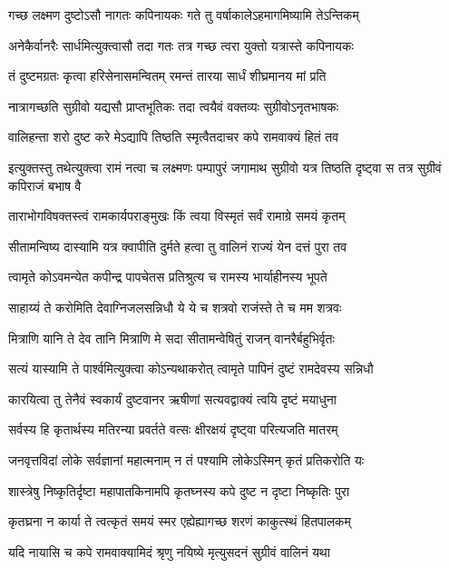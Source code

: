 \twolineshloka
{गच्छ लक्ष्मण दुष्टोऽसौ नागतः कपिनायकः}
{गते तु वर्षाकालेऽहमागमिष्यामि तेऽन्तिकम्} %

\twolineshloka
{अनेकैर्वानरैः सार्धमित्युक्त्वासौ तदा गतः}
{तत्र गच्छ त्वरा युक्तो यत्रास्ते कपिनायकः} %

\twolineshloka
{तं दुष्टमग्रतः कृत्वा हरिसेनासमन्वितम्}
{रमन्तं तारया सार्धं शीघ्रमानय मां प्रति} %

\twolineshloka
{नात्रागच्छति सुग्रीवो यद्यसौ प्राप्तभूतिकः}
{तदा त्वयैवं वक्तव्यः सुग्रीवोऽनृतभाषकः} %

\twolineshloka
{वालिहन्ता शरो दुष्ट करे मेऽद्यापि तिष्ठति}
{स्मृत्वैतदाचर कपे रामवाक्यं हितं तव} %

\threelineshloka
{इत्युक्तस्तु तथेत्युक्त्वा रामं नत्वा च लक्ष्मणः}
{पम्पापुरं जगामाथ सुग्रीवो यत्र तिष्ठति}
{दृष्ट्वा स तत्र सुग्रीवं कपिराजं बभाष वै} %

\twolineshloka
{ताराभोगविषक्तस्त्वं रामकार्यपराङ्मुखः}
{किं त्वया विस्मृतं सर्वं रामाग्रे समयं कृतम्} %

\twolineshloka
{सीतामन्विष्य दास्यामि यत्र क्वापीति दुर्मते}
{हत्वा तु वालिनं राज्यं येन दत्तं पुरा तव} %

\twolineshloka
{त्वामृते कोऽवमन्येत कपीन्द्र पापचेतस}
{प्रतिश्रुत्य च रामस्य भार्याहीनस्य भूपते} %

\twolineshloka
{साहाय्यं ते करोमिति देवाग्निजलसन्निधौ}
{ये ये च शत्रवो राजंस्ते ते च मम शत्रवः} %

\twolineshloka
{मित्राणि यानि ते देव तानि मित्राणि मे सदा}
{सीतामन्वेषितुं राजन् वानरैर्बहुभिर्वृतः} %

\twolineshloka
{सत्यं यास्यामि ते पार्श्वमित्युक्त्वा कोऽन्यथाकरोत्}
{त्वामृते पापिनं दुष्टं रामदेवस्य सन्निधौ} %

\twolineshloka
{कारयित्वा तु तेनैवं स्वकार्यं दुष्टवानर}
{ऋषीणां सत्यवद्वाक्यं त्वयि दृष्टं मयाधुना} %

\twolineshloka
{सर्वस्य हि कृतार्थस्य मतिरन्या प्रवर्तते}
{वत्सः क्षीरक्षयं दृष्ट्वा परित्यजति मातरम्} %

\twolineshloka
{जनवृत्तविदां लोके सर्वज्ञानां महात्मनाम्}
{न तं पश्यामि लोकेऽस्मिन् कृतं प्रतिकरोति यः} %

\twolineshloka
{शास्त्रेषु निष्कृतिर्दृष्टा महापातकिनामपि}
{कृतघ्नस्य कपे दुष्ट न दृष्टा निष्कृतिः पुरा} %

\twolineshloka
{कृतघ्रना न कार्या ते त्वत्कृतं समयं स्मर}
{एह्येह्यागच्छ शरणं काकुत्स्थं हितपालकम्} %

\twolineshloka
{यदि नायासि च कपे रामवाक्यामिदं श्रृणु}
{नयिष्ये मृत्युसदनं सुग्रीवं वालिनं यथा} %

